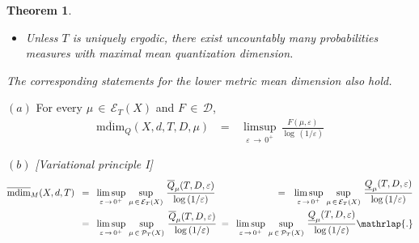 \documentclass[11pt,a4paper,reqno]{amsart}
\theoremstyle{plain}
\newtheorem{maintheorem}{Theorem}
\theoremstyle{definition}
\newcommand{\ep} {\varepsilon}
\newcommand{\cP}{{\mathcal P}}
\newcommand{\cD}{{\mathcal D}}
\newcommand{\cE}{{\mathcal E}}
\newcommand{\mdim}{\mathrm{mdim}}
\begin{document}
\begin{maintheorem}
\begin{itemize}
\begin{equation}\label{eq:vpQ}
\begin{alignedat}{3}
\mathrm{\overline{mdim}_M}(X,d,T)\, \,
&=\,\, \max_{\mu\,\in\,\cP_T(X)}\,\, \,\mathrm{\overline{mdim}_Q}(X,d,T,D,\mu) \\
& =\,\, \max_{\mu\,\in\,\cP_T(X)}\, \,\limsup_{\ep\,\to\,0^+}\,\frac{\overline{Q}_\mu(T,D,\ep)}{\log\,(1/\ep)} \\
& =\,\, \max_{\mu\,\in\,\cP_T(X)}\, \,\limsup_{\ep\,\to\,0^+}\,\frac{\underline{Q}_\mu(T,D,\ep)}{\log\,(1/\ep)} \mathrlap{.}
\end{alignedat}
\end{equation}
\smallskip 

\item[$(d)$] Unless $T$ is uniquely ergodic, there exist uncountably many probabilities measures with maximal mean quantization dimension.
\end{itemize}
\smallskip

\color{black}
The corresponding statements for the lower metric mean dimension also hold. 
\end{maintheorem}


\iffalse

\noindent $(a)$ For every $\mu\,\in\,\cE_T(X)$  and $F\,\in\,\cD$,
\begin{eqnarray*}
\overline{\mathrm{mdim}}_Q(X,d,T,D,\mu) &\,=\,& \limsup_{\ep\,\to\,0^+}\,\frac{F(\mu,\ep)}{\log\,(1/\ep)} %
\end{eqnarray*}

\noindent $(b)$ \emph{[Variational principle I]}
\begin{equation*}
    \begin{alignedat}{3}
        \overline{\mdim}_M(X,d,T) \, \,\,&=\,\,\, \limsup_{\varepsilon \, \to \, 0^+}\, \sup_{\mu \,\in\, \mathcal{E}_T(X)} \, \frac{\overline{Q}_\mu(T,D,\ep)}{\log\,(1/\varepsilon)} \, \,\,&=\,\,\,\, \limsup_{\varepsilon \, \to \, 0^+}\, \sup_{\mu \,\in\, \mathcal{E}_T(X)} \, \frac{\underline{Q}_\mu(T,D,\ep)}{\log\,(1/\varepsilon)}
        \\
        &=\,\, \,\limsup_{\varepsilon \, \to \, 0^+}\, \sup_{\mu \,\in\, \mathcal{P}_T(X)} \, \frac{\overline{Q}_\mu(T,D,\ep)}{\log\,(1/\varepsilon)} \,\, \,&=\,\,\, \limsup_{\varepsilon \, \to \, 0^+}\, \sup_{\mu \,\in\, \mathcal{P}_T(X)} \, \frac{\underline{Q}_\mu(T,D,\ep)}{\log\,(1/\varepsilon)}\mathrlap{.}
    \end{alignedat}
\end{equation*}
\smallskip
\end{document}
